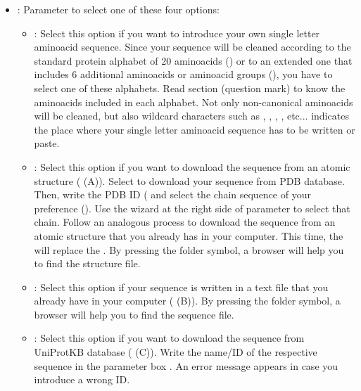\begin{itemize}
\begin{itemize}
  \begin{itemize}
  \item {}: Parameter to select one of these four options:\\
   \begin{itemize}
   \item {}: Select this option if you want to introduce your own single letter aminoacid sequence. Since your sequence will be cleaned according to the standard protein alphabet of 20 aminoacids () or to an extended one that includes 6 additional aminoacids or aminoacid groups (), you have to select one of these  alphabets. Read  section (question mark) to know the aminoacids included in each alphabet. Not only non-canonical aminoacids will be cleaned, but also wildcard characters such as \ttt{*}, \ttt{\#}, , \ttt{-}, etc...  indicates the place where your single letter aminoacid sequence has to be written or paste.\\ 
   \item {}: Select this option if you want to download the sequence from an atomic structure ( (A)). Select  to download your sequence from PDB database. Then, write the PDB ID ( and select the chain sequence of your preference (). Use the wizard at the right side of  parameter to select that chain. Follow an analogous process to download the sequence from an atomic structure that you already has in your computer. This time, the  will replace the . By pressing the folder symbol, a browser will help you to find the structure file.\\
   \item {}: Select this option if your sequence is written in a text file that you already have in your computer ( (B)). By pressing the folder symbol, a browser will help you to find the sequence file.\\
   \item {}: Select this option if you want to download the sequence from UniProtKB database ( (C)). Write the name/ID of the respective sequence in the parameter box . An error message appears in case you introduce a wrong ID.\\
   

\end{itemize}
\end{itemize}
\end{itemize}
\end{itemize}
